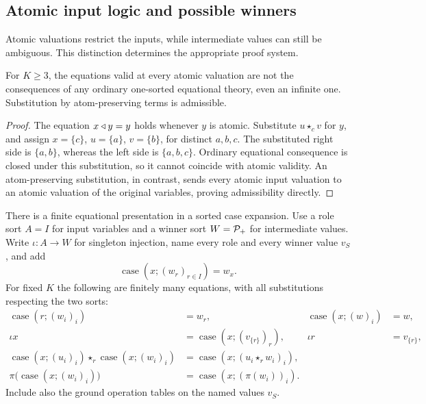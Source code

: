 \subsection{Atomic input logic and possible winners}
\label{app:atomic-inputs}

Atomic valuations restrict the inputs, while intermediate values can still
be ambiguous. This distinction determines the appropriate proof system.

\begin{proposition}
\label{olv:prop:atomic-substitution}
For $K\geq3$, the equations valid at every atomic valuation are not the
consequences of any ordinary one-sorted equational theory, even an infinite
one. Substitution by atom-preserving terms is admissible.
\end{proposition}
\begin{proof}
The equation $x\mathbin{\triangleleft} y=y$ holds whenever $y$ is atomic. Substitute
$u\star_c v$ for $y$, and assign $x=\{c\}$, $u=\{a\}$, $v=\{b\}$,
for distinct $a,b,c$. The substituted right side is $\{a,b\}$, whereas
the left side is $\{a,b,c\}$. Ordinary equational consequence is closed
under this substitution, so it cannot coincide with atomic validity.
An atom-preserving substitution, in contrast, sends every atomic input
valuation to an atomic valuation of the original variables, proving
admissibility directly.
\end{proof}

There is a finite equational presentation in a sorted case expansion.
Use a role sort $A=I$ for input variables and a winner sort $W=\mathcal P_+$
for intermediate values. Write $\iota:A\to W$ for singleton injection,
name every role and every winner value $v_S$, and add
\[
 \operatorname{case}(x;(w_r)_{r\in I})=w_x.
\]
For fixed $K$ the following are finitely many equations, with all
substitutions respecting the two sorts:
\begin{align*}
 \operatorname{case}(r;(w_i)_i)&=w_r,&
 \operatorname{case}(x;(w)_i)&=w,\\
 \iota x&=\operatorname{case}(x;(v_{\{r\}})_r),&
 \iota r&=v_{\{r\}},\\
 \operatorname{case}(x;(u_i)_i)\star_r
   \operatorname{case}(x;(w_i)_i)
   &=\operatorname{case}(x;(u_i\star_r w_i)_i),\\
 \pi\bigl(\operatorname{case}(x;(w_i)_i)\bigr)
   &=\operatorname{case}(x;(\pi(w_i))_i).
\end{align*}
Include also the ground operation tables on the named values $v_S$.

